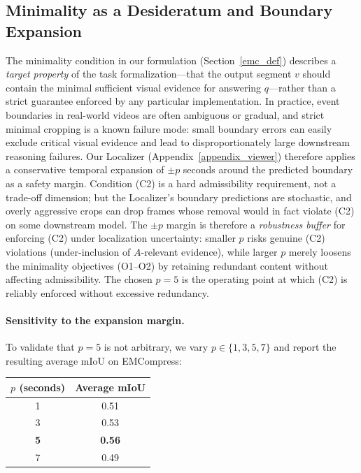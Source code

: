 \subsection{Minimality as a Desideratum and Boundary Expansion}
\label{appendix:discussion_minimality}

The minimality condition in our formulation (Section~\ref{emc_def}) describes a \textit{target property} of the task formalization---that the output segment $v$ should contain the minimal sufficient visual evidence for answering $q$---rather than a strict guarantee enforced by any particular implementation. In practice, event boundaries in real-world videos are often ambiguous or gradual, and strict minimal cropping is a known failure mode: small boundary errors can easily exclude critical visual evidence and lead to disproportionately large downstream reasoning failures. Our Localizer (Appendix~\ref{appendix_viewer}) therefore applies a conservative temporal expansion of $\pm p$ seconds around the predicted boundary as a safety margin. Condition (C2) is a hard admissibility requirement, not a trade-off dimension; but the Localizer's boundary predictions are stochastic, and overly aggressive crops can drop frames whose removal would in fact violate (C2) on some downstream model. The $\pm p$ margin is therefore a \textit{robustness buffer} for enforcing (C2) under localization uncertainty: smaller $p$ risks genuine (C2) violations (under-inclusion of $A$-relevant evidence), while larger $p$ merely loosens the minimality objectives (O1--O2) by retaining redundant content without affecting admissibility. The chosen $p{=}5$ is the operating point at which (C2) is reliably enforced without excessive redundancy.

\paragraph{Sensitivity to the expansion margin.}
To validate that $p{=}5$ is not arbitrary, we vary $p \in \{1, 3, 5, 7\}$ and report the resulting average mIoU on EMCompress:

\begin{center}
\begin{tabular}{cc}
\toprule
$p$ (seconds) & Average mIoU \\
\midrule
1 & 0.51 \\
3 & 0.53 \\
\textbf{5} & \textbf{0.56} \\
7 & 0.49 \\
\bottomrule
\end{tabular}
\end{center}


